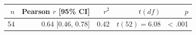 \begin{tabular}{rrrrr}
\toprule
$n$ & Pearson $r$ [95\% CI] & $r^2$ & $t(df)$ & $p$ \\
\midrule
54 & 0.64 [0.46, 0.78] & 0.42 & $t(52) = 6.08$ & < .001 \\
\bottomrule
\end{tabular}
